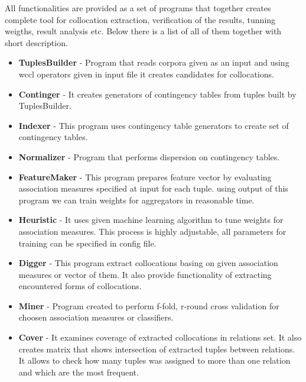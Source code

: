 All functionalities are provided as a set of programs that together creates complete tool for collocation extraction,
verification of the results, tunning weigths, result analysis etc. Below there is a list of all of them together with short description.
\begin{itemize}
    \item \textbf{TuplesBuilder} - Program that reads corpora given as an input and using wccl operators given in input file 
    it creates candidates for collocations.
 
    \item \textbf{Continger} - It creates generators of contingency tables from tuples built by TuplesBuilder.
 
    \item \textbf{Indexer} - This program uses contingency table generators to create set of contingency tables.
 
    \item \textbf{Normalizer} - Program that performs dispersion on contingency tables.
 
    \item \textbf{FeatureMaker} - This program prepares feature vector by evaluating association measures specified at input for each tuple. 
    using output of this program we can train weights for aggregators in reasonable time.
 
    \item \textbf{Heuristic} - It uses given machine learning algorithm to tune weights for association measures. 
    This process is highly adjustable, all parameters for training can be specified in config file.
 
    \item \textbf{Digger} - This program extract collocations basing on given association measures or vector of them. 
    It also provide functionality of extracting encountered forms of collocations.
 
    \item \textbf{Miner} - Program created to perform f-fold, r-round cross validation for choosen association measures or classifiers.
    
    \item \textbf{Cover} - It examines coverage of extracted collocations in relations set. It also creates matrix 
    that shows intersection of extracted tuples between relations. It allows to check how many tuples was assigned to more than one relation 
    and which are the most frequent.
 

\end{itemize}
